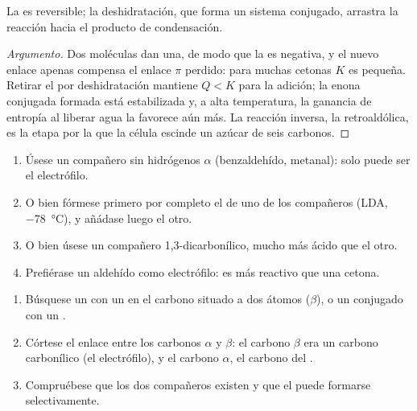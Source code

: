 \begin{proposition}\label{prop:b2:enolates-aldol:aldol-equilibrium}
La  es reversible; la deshidratación, que forma un sistema conjugado, arrastra la
reacción hacia el producto de condensación.
\end{proposition}

\begin{proof}[Argumento]
Dos moléculas dan una, de modo que la  es negativa, y el nuevo enlace  apenas
compensa el enlace $\pi$  perdido: para muchas cetonas $K$ es pequeña. Retirar el  por deshidratación
mantiene $Q < K$ para la adición; la enona conjugada formada está estabilizada y, a alta temperatura,
la ganancia de entropía al liberar agua la favorece aún más. La reacción inversa, la retroaldólica, es la
etapa por la que la célula escinde un azúcar de seis carbonos.
\end{proof}

\begin{method}\label{met:b2:enolates-aldol:crossed-aldol}
\begin{enumerate}
  \item Úsese un compañero sin hidrógenos $\alpha$ (benzaldehído, metanal): solo puede ser el
        electrófilo.
  \item O bien fórmese primero por completo el  de uno de los compañeros (LDA, \qty{-78}{\degreeCelsius}), y añádase luego
        el otro.
  \item O bien úsese un compañero 1,3-dicarbonílico, mucho más ácido que el otro.
  \item Prefiérase un aldehído como electrófilo: es más reactivo que una cetona.
\end{enumerate}
\end{method}

\begin{method}\label{met:b2:enolates-aldol:aldol-recognition}
\begin{enumerate}
  \item Búsquese un  con un  en el carbono situado a dos átomos ($\beta$), o un 
        conjugado con un .
  \item Córtese el enlace entre los carbonos $\alpha$ y $\beta$: el carbono $\beta$ era un carbono carbonílico (el
        electrófilo), y el carbono $\alpha$, el carbono del .
  \item Compruébese que los dos compañeros existen y que el  puede formarse selectivamente.
\end{enumerate}
\end{method}

